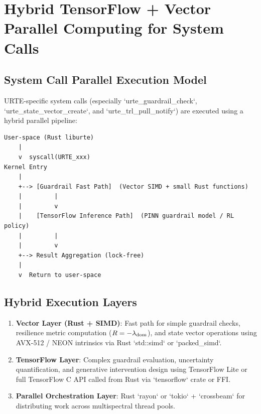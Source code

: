 \documentclass[11pt,a4paper]{report}
\begin{document}
\chapter{Hybrid TensorFlow + Vector Parallel Computing for System Calls}

\section{System Call Parallel Execution Model}

URTE-specific system calls (especially `urte_guardrail_check`, `urte_state_vector_create`, and `urte_trl_pull_notify`) are executed using a hybrid parallel pipeline:

\begin{lstlisting}[style=kernelschema, caption={Hybrid Syscall Execution Flow (ASCII)}]
User-space (Rust liburte)
    |
    v  syscall(URTE_xxx)
Kernel Entry
    |
    +--> [Guardrail Fast Path]  (Vector SIMD + small Rust functions)
    |         |
    |         v
    |    [TensorFlow Inference Path]  (PINN guardrail model / RL policy)
    |         |
    |         v
    +--> Result Aggregation (lock-free)
    |
    v  Return to user-space
\end{lstlisting}

\section{Hybrid Execution Layers}

\begin{enumerate}
    \item \textbf{Vector Layer (Rust + SIMD)}: Fast path for simple guardrail checks, resilience metric computation ($R = -\lambda_{\rm dom}$), and state vector operations using AVX-512 / NEON intrinsics via Rust `std::simd` or `packed_simd`.
    \item \textbf{TensorFlow Layer}: Complex guardrail evaluation, uncertainty quantification, and generative intervention design using TensorFlow Lite or full TensorFlow C API called from Rust via `tensorflow` crate or FFI.
    \item \textbf{Parallel Orchestration Layer}: Rust `rayon` or `tokio` + `crossbeam` for distributing work across multispectral thread pools.
\end{enumerate}

\end{document}
